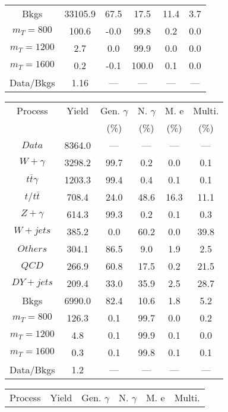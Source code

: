 \begin{figure}
\begin{minipage}[c]{0.32\textwidth}
{\begin{tabular}{cccccc}
Bkgs &  33105.9 &  67.5 &  17.5 &  11.4 &  3.7\\
$ m_{T} = 800 $ &  100.6 &  -0.0 &  99.8 &  0.2 &  0.0\\
$ m_{T} = 1200 $ &  2.7 &  0.0 &  99.9 &  0.0 &  0.0\\
$ m_{T} = 1600 $ &  0.2 &  -0.1 &  100.0 &  0.1 &  0.0\\
Data/Bkgs &  1.16 &  --- &  --- &  --- &  ---\\
\hline
\end{tabular}
}
\end{minipage}
\begin{minipage}[c]{0.32\textwidth}
\centering
\tiny{
\begin{tabular}{cccccc}
\hline
Process & Yield & Gen. $\gamma$ & N. $\gamma$ & M. e & Multi. \\
 &  & (\%) & (\%) & (\%) & (\%)  \\
\hline
                                                                      $ Data $ &  8364.0 &  --- &  --- &  --- &  ---\\
$ W+\gamma $ &  3298.2 &  99.7 &  0.2 &  0.0 &  0.1\\
$ t\bar{t}\gamma $ &  1203.3 &  99.4 &  0.4 &  0.1 &  0.1\\
$ t/t\bar{t} $ &  708.4 &  24.0 &  48.6 &  16.3 &  11.1\\
$ Z+\gamma $ &  614.3 &  99.3 &  0.2 &  0.1 &  0.3\\
$ W+jets $ &  385.2 &  0.0 &  60.2 &  0.0 &  39.8\\
$ Others $ &  304.1 &  86.5 &  9.0 &  1.9 &  2.5\\
$ QCD $ &  266.9 &  60.8 &  17.5 &  0.2 &  21.5\\
$ DY+jets $ &  209.4 &  33.0 &  35.9 &  2.5 &  28.7\\
Bkgs &  6990.0 &  82.4 &  10.6 &  1.8 &  5.2\\
$ m_{T} = 800 $ &  126.3 &  0.1 &  99.7 &  0.0 &  0.2\\
$ m_{T} = 1200 $ &  4.8 &  0.1 &  99.9 &  0.1 &  0.0\\
$ m_{T} = 1600 $ &  0.3 &  0.1 &  99.8 &  0.1 &  0.1\\
Data/Bkgs &  1.2 &  --- &  --- &  --- &  ---\\
\hline
\end{tabular}
}
\end{minipage}
\begin{minipage}[c]{0.32\textwidth}
\centering
\tiny{
\begin{tabular}{cccccc}
\hline
Process & Yield & Gen. $\gamma$ & N. $\gamma$ & M. e & Multi. \\

\end{tabular}}
\end{minipage}
\end{figure}
